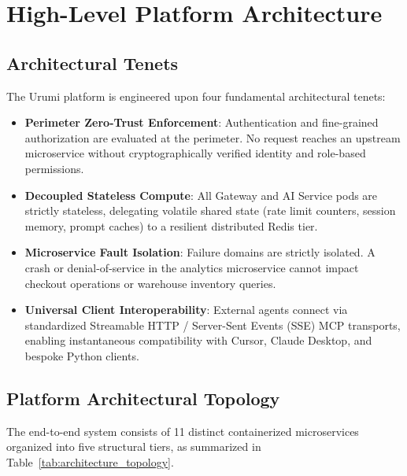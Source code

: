 \documentclass[11pt,a4paper]{article}
\begin{document}
\section{High-Level Platform Architecture}

\subsection{Architectural Tenets}
The Urumi platform is engineered upon four fundamental architectural tenets:
\begin{itemize}[leftmargin=*]
    \item \textbf{Perimeter Zero-Trust Enforcement}: Authentication and fine-grained authorization are evaluated at the perimeter. No request reaches an upstream microservice without cryptographically verified identity and role-based permissions.
    \item \textbf{Decoupled Stateless Compute}: All Gateway and AI Service pods are strictly stateless, delegating volatile shared state (rate limit counters, session memory, prompt caches) to a resilient distributed Redis tier.
    \item \textbf{Microservice Fault Isolation}: Failure domains are strictly isolated. A crash or denial-of-service in the analytics microservice cannot impact checkout operations or warehouse inventory queries.
    \item \textbf{Universal Client Interoperability}: External agents connect via standardized Streamable HTTP / Server-Sent Events (SSE) MCP transports, enabling instantaneous compatibility with Cursor, Claude Desktop, and bespoke Python clients.
\end{itemize}

\subsection{Platform Architectural Topology}
The end-to-end system consists of 11 distinct containerized microservices organized into five structural tiers, as summarized in Table~\ref{tab:architecture_topology}.
\end{document}
